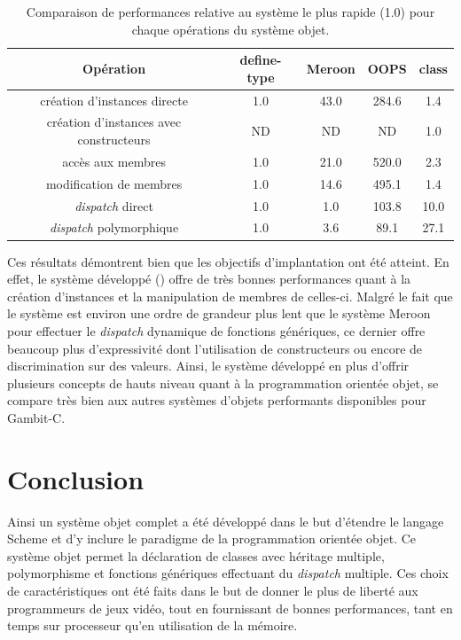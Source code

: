 \documentclass[12pt,oneside,letterpaper,francais]{book}
\newcommand{\scheme}[1]{\selectlanguage{english}{\tt #1}\selectlanguage{french}}
\begin{document}
\begin{table}
  \center
  \begin{tabular}{ccccc}
    \hline
    Opération & define-type & Meroon & OOPS & class \\
    \hline \hline
    création d'instances directe & 1.0 & 43.0 & 284.6 & 1.4 \\
    création d'instances avec constructeurs & ND & ND & ND & 1.0 \\
    accès aux membres & 1.0 & 21.0 & 520.0 & 2.3 \\
    modification de membres & 1.0 & 14.6 & 495.1 & 1.4 \\
    \textit{dispatch} direct & 1.0 & 1.0 & 103.8 & 10.0 \\
    \textit{dispatch} polymorphique & 1.0 & 3.6 & 89.1 & 27.1 \\
    \hline
  \end{tabular}
  \caption{Comparaison de performances relative au système le plus
    rapide (1.0) pour chaque opérations du système objet.}
  \label{OO:bench-rel}
\end{table}

Ces résultats démontrent bien que les objectifs d'implantation ont été
atteint. En effet, le système développé (\scheme{class}) offre de très
bonnes performances quant à la création d'instances et la manipulation
de membres de celles-ci. Malgré le fait que le système est environ une
ordre de grandeur plus lent que le système Meroon pour effectuer le
\textit{dispatch} dynamique de fonctions génériques, ce dernier offre
beaucoup plus d'expressivité dont l'utilisation de constructeurs ou
encore de discrimination sur des valeurs. Ainsi, le système développé
en plus d'offrir plusieurs concepts de hauts niveau quant à la
programmation orientée objet, se compare très bien aux autres systèmes
d'objets performants disponibles pour Gambit-C.

\section{Conclusion}
Ainsi un système objet complet a été développé dans le but d'étendre
le langage Scheme et d'y inclure le paradigme de la programmation
orientée objet. Ce système objet permet la déclaration de classes avec
héritage multiple, polymorphisme et fonctions génériques effectuant du
\textit{dispatch} multiple. Ces choix de caractéristiques ont été
faits dans le but de donner le plus de liberté aux programmeurs de
jeux vidéo, tout en fournissant de bonnes performances, tant en temps
sur processeur qu'en utilisation de la mémoire.
\end{document}
